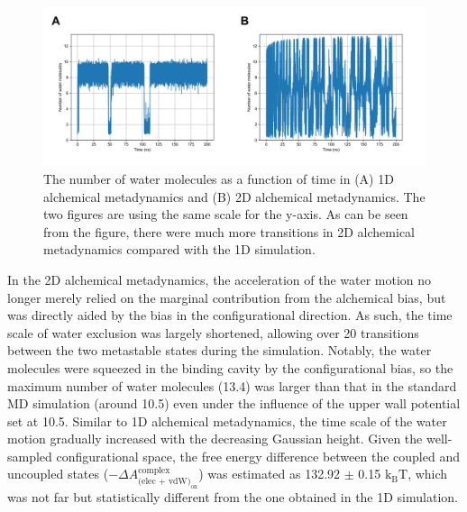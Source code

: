 \documentclass[journal=jacsat,manuscript=article]{achemso}
\begin{document}
\begin{figure}[ht]
    \centering
    \includegraphics[width=\textwidth]{Figures/water_timeseries.png}  
    \caption{The number of water molecules as a function of time in (A) 1D alchemical metadynamics and (B) 2D alchemical metadynamics. The two figures are using the same scale for the y-axis. As can be seen from the figure, there were much more transitions in 2D alchemical metadynamics compared with the 1D simulation.}
    \label{water_timerseries}
\end{figure}

In the 2D alchemical metadynamics, the acceleration of the water motion no longer merely relied on the marginal contribution from the alchemical bias, but was directly aided by the bias in the configurational direction. As such, the time scale of water exclusion was largely shortened, allowing over 20 transitions between the two metastable states during the simulation. Notably, the water molecules were squeezed in the binding cavity by the configurational bias, so the maximum number of water molecules (13.4) was larger than that in the standard MD simulation (around 10.5) even under the influence of the upper wall potential set at 10.5. Similar to 1D alchemical metadynamics, the time scale of the water motion gradually increased with the decreasing Gaussian height. Given the well-sampled configurational space, the free energy difference between the coupled and uncoupled states ($-\Delta A^{\text{complex}}_{\text{(elec + vdW)}_{\text{on}}}$) was estimated as 132.92 $\pm$ 0.15 $\text{k}_{\text{B}}\text{T}$, which was not far but statistically different from the one obtained in the 1D simulation. 
\end{document}
